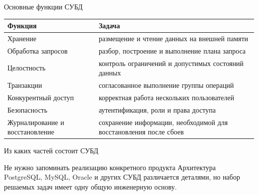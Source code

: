 \documentclass[aspectratio=169]{beamer}
\begin{document}
\begin{frame}{Основные функции СУБД}
\small
\begin{table}
\centering
\begin{tabular}{p{}|p{}}
\toprule
\textbf{Функция} & \textbf{Задача}\\
\midrule
Хранение & размещение и чтение данных на внешней памяти\\
Обработка запросов & разбор, построение и выполнение плана запроса\\
Целостность & контроль ограничений и допустимых состояний данных\\
Транзакции & согласованное выполнение группы операций\\
Конкурентный доступ & корректная работа нескольких пользователей\\
Безопасность & аутентификация, роли и права доступа\\
Журналирование и восстановление & сохранение информации, необходимой для восстановления после сбоев\\
\bottomrule
\end{tabular}
\end{table}
\end{frame}

\begin{frame}{Из каких частей состоит СУБД}
\begin{center}
\end{center}
\vspace{0.2cm}
\begin{alertblock}{Не нужно запоминать реализацию конкретного продукта}
Архитектура PostgreSQL, MySQL, Oracle и других СУБД различается деталями,
но набор решаемых задач имеет одну общую инженерную основу.
\end{alertblock}
\end{frame}
\end{document}
